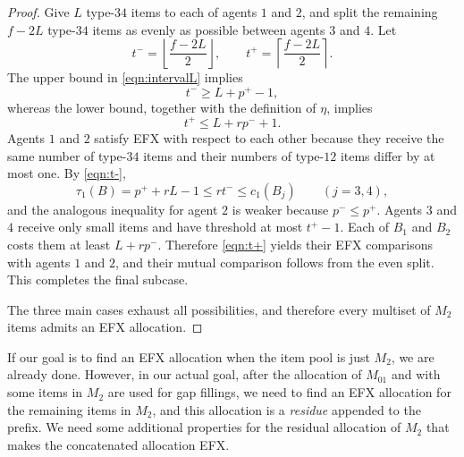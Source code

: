 \documentclass{article}
\theoremstyle{definition}
\begin{document}
\begin{proof}
Give $L$ type-$34$ items to each of agents $1$ and $2$, and split the
remaining $f-2L$ type-$34$ items as evenly as possible between agents $3$ and
$4$.  Let
\[
 t^- =\left\lfloor\frac{f-2L}{2}\right\rfloor,
 \qquad
 t^+ =\left\lceil\frac{f-2L}{2}\right\rceil.
\]
The upper bound in \eqref{eqn:intervalL} implies
\begin{equation}\label{eqn:t-}
     t^-\ge L+p^+-1,
\end{equation}
whereas the lower bound, together with the definition of $\eta$, implies
\begin{equation}\label{eqn:t+}
     t^+\le L+rp^-+1.
\end{equation}
Agents $1$ and $2$ satisfy EFX with respect to each other because they receive
the same number of type-$34$ items and their numbers of type-$12$ items differ
by at most one.  By \eqref{eqn:t-},
\[
 \tau_1(B)=p^++rL-1\le rt^-\le c_1(B_j)
 \qquad(j=3,4),
\]
and the analogous inequality for agent $2$ is weaker because $p^-\le p^+$.
Agents $3$ and $4$ receive only small items and have threshold at most
$t^+-1$.  Each of $B_1$ and $B_2$ costs them at least $L+rp^-$.  Therefore
\eqref{eqn:t+} yields their EFX comparisons with agents $1$ and $2$, and their mutual
comparison follows from the even split.  This completes the final subcase.

The three main cases exhaust all possibilities, and therefore every multiset
of $M_2$ items admits an EFX allocation.
\end{proof}


If our goal is to find an EFX allocation when the item pool is just $M_2$, we are already done.
However, in our actual goal, after the allocation of $M_{01}$ and with some items in $M_2$ are used for gap fillings, we need to find an EFX allocation for the remaining items in $M_2$, and this allocation is a \emph{residue} appended to the prefix.
We need some additional properties for the residual allocation of $M_2$ that makes the concatenated allocation EFX.
\end{document}
